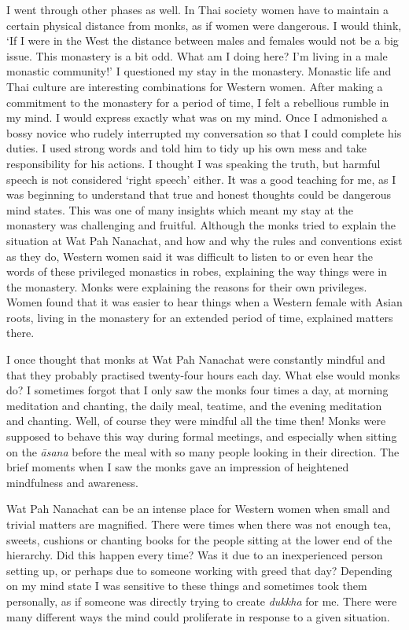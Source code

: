 I went through other phases as well. In Thai society women have to
maintain a certain physical distance from monks, as if women were
dangerous. I would think, `If I were in the West the distance between
males and females would not be a big issue. This monastery is a bit odd. 
What am I doing here? I'm living in a male monastic community!' I
questioned my stay in the monastery. Monastic life and Thai culture are
interesting combinations for Western women. After making a commitment to
the monastery for a period of time, I felt a rebellious rumble in my
mind. I would express exactly what was on my mind. Once I admonished a
bossy novice who rudely interrupted my conversation so that I could
complete his duties. I used strong words and told him to tidy up his own
mess and take responsibility for his actions. I thought I was speaking
the truth, but harmful speech is not considered `right speech' either. 
It was a good teaching for me, as I was beginning to understand that
true and honest thoughts could be dangerous mind states. This was one of
many insights which meant my stay at the monastery was challenging and
fruitful. Although the monks tried to explain the situation at Wat Pah
Nanachat, and how and why the rules and conventions exist as they do, 
Western women said it was difficult to listen to or even hear the words
of these privileged monastics in robes, explaining the way things were
in the monastery. Monks were explaining the reasons for their own
privileges. Women found that it was easier to hear things when a Western
female with Asian roots, living in the monastery for an extended period
of time, explained matters there. 

I once thought that monks at Wat Pah Nanachat were constantly mindful
and that they probably practised twenty-four hours each day. What else
would monks do? I sometimes forgot that I only saw the monks four times
a day, at morning meditation and chanting, the daily meal, teatime, and
the evening meditation and chanting. Well, of course they were mindful
all the time then! Monks were supposed to behave this way during formal
meetings, and especially when sitting on the \emph{āsana} before the
meal with so many people looking in their direction. The brief moments
when I saw the monks gave an impression of heightened mindfulness and
awareness. 

Wat Pah Nanachat can be an intense place for Western women when small
and trivial matters are magnified. There were times when there was not
enough tea, sweets, cushions or chanting books for the people sitting at
the lower end of the hierarchy. Did this happen every time? Was it due
to an inexperienced person setting up, or perhaps due to someone working
with greed that day? Depending on my mind state I was sensitive to these
things and sometimes took them personally, as if someone was directly
trying to create \emph{dukkha} for me. There were many different ways
the mind could proliferate in response to a given situation. 


